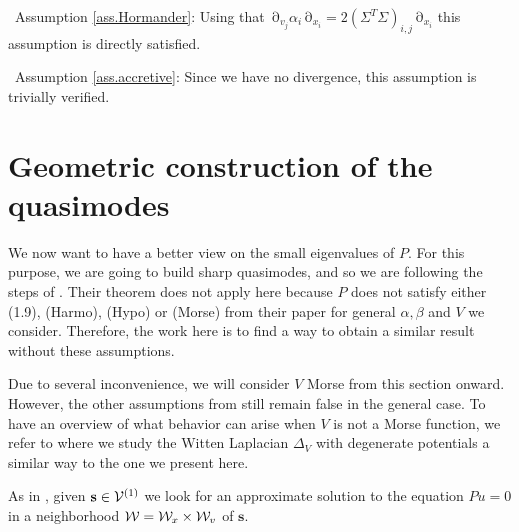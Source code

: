 \documentclass[12pt]{amsart}
\numberwithin{equation}{section}
\numberwithin{figure}{section}
\def\s{\mathbf{s}}
\DeclareMathOperator{\p}{\partial}
\begin{document}
\textbullet\ Assumption \ref{ass.Hormander}: Using that $\p_{v_j}\alpha_i\p_{x_i} = 2(\Sigma^T\Sigma)_{i,j}\p_{x_i}$ this assumption is directly satisfied.

\textbullet\ Assumption \ref{ass.accretive}: Since we have no divergence, this assumption is trivially verified.













































\section{Geometric construction of the quasimodes}\label{sec:geoloc}

We now want to have a better view on the small eigenvalues of $P$. For this purpose, we are going to build sharp quasimodes, and so we are following the steps of \cite[section 3\&4]{BoLePMi22}. Their theorem does not apply here because $P$ does not satisfy either (1.9), (Harmo), (Hypo) or (Morse) from their paper for general $\alpha,\beta$ and $V$ we consider. Therefore, the work here is to find a way to obtain a similar result without these assumptions.

Due to several inconvenience, we will consider $V$ Morse from this section onward. However, the other assumptions from \cite{BoLePMi22} still remain false in the general case. To have an overview of what behavior can arise when $V$ is not a Morse function, we refer to \cite{De25_1} where we study the Witten Laplacian $\Delta_V$ with degenerate potentials a similar way to the one we present here.

As in \cite{BoLePMi22}, given $\s\in\vvv^{(1)}$ we look for an approximate solution to the equation $Pu = 0$ in a neighborhood ${\mathcal W} = {\mathcal W}_x\times{\mathcal W}_v$ of $\s$.
\end{document}
